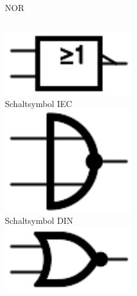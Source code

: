 \begin{frame}{NOR}
  \begin{columns}
    \includegraphics[width=\textwidth,height=.2\textheight,keepaspectratio]{a14/NOR_IEC.pdf}\\
    {\small Schaltsymbol IEC}\\
    \includegraphics[width=\textwidth,height=.2\textheight,keepaspectratio]{a14/NOR_DIN.pdf}\\
    {\small Schaltsymbol DIN}\\
    \includegraphics[width=\textwidth,height=.2\textheight,keepaspectratio]{a14/NOR_ANSI.pdf}\\

\end{columns}
\end{frame}

